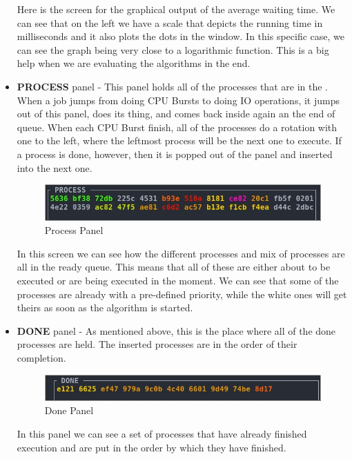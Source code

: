 \documentclass{article}
\newcommand{\code}[1]{\codeinline{\texttt{#1}}}
\begin{document}
\begin{itemize}
  Here is the screen for the graphical output of the average waiting time. We can see that on the left we have a scale that depicts the running time in milliseconds and it also plots the dots in the window. In this specific case, we can see the graph being very close to a logarithmic function. This is a big help when we are evaluating the algorithms in the end.

\item \textbf{PROCESS} panel - This panel holds all of the processes that are in the \code{ready\_queue}. When a job jumps from doing CPU Bursts to doing IO operations, it jumps out of this panel, does its thing, and comes back inside again an the end of queue. When each CPU Burst finish, all of the processes do a rotation with one to the left, where the leftmost process will be the next one to execute. If a process is done, however, then it is popped out of the panel and inserted into the next one.

  \begin{figure}[H]
    \includegraphics[width=\linewidth]{./pics/prcs.jpg}
    \caption{Process Panel}
    \label{fig:Process Panel}
  \end{figure}

  In this screen we can see how the different processes and mix of processes are all in the ready queue. This means that all of these are either about to be executed or are being executed in the moment. We can see that some of the processes are already with a pre-defined priority, while the white ones will get theirs as soon as the algorithm is started.

\item \textbf{DONE} panel - As mentioned above, this is the place where all of the done processes are held. The inserted processes are in the order of their completion.

  \begin{figure}[H]
    \includegraphics[width=\linewidth]{./pics/doneq.jpg}
    \caption{Done Panel}
    \label{fig:Done Panel}
  \end{figure}

  In this panel we can see a set of processes that have already finished execution and are put in the order by which they have finished.


\end{itemize}
\end{document}
